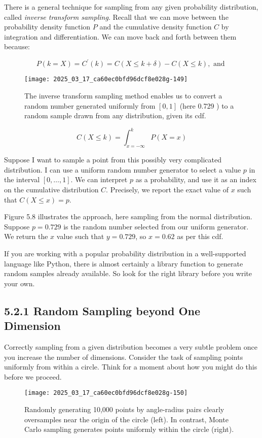 \documentclass[10pt]{article}
\begin{document}
There is a general technique for sampling from any given probability distribution, called \emph{inverse transform sampling}. Recall that we can move between the probability density function $P$ and the cumulative density function $C$ by integration and differentiation. We can move back and forth between them because:

\[
P(k=X)=C^{\prime}(k)=C(X \leq k+\delta)-C(X \leq k), \text { and }
\]

\begin{figure}[h]
\centering
\texttt{[image: 2025\_03\_17\_ca60ec0bfd96dcf8e028g-149]}
\caption{The inverse transform sampling method enables us to convert a random number generated uniformly from $[0,1]$ (here 0.729 ) to a random sample drawn from any distribution, given its cdf.}
\end{figure}

\[
C(X \leq k)=\int_{x=-\infty}^{k} P(X=x)
\]

Suppose I want to sample a point from this possibly very complicated distribution. I can use a uniform random number generator to select a value $p$ in the interval $[0, \ldots, 1]$. We can interpret $p$ as a probability, and use it as an index on the cumulative distribution $C$. Precisely, we report the exact value of $x$ such that $C(X \leq x)=p$.

Figure 5.8 illustrates the approach, here sampling from the normal distribution. Suppose $p=0.729$ is the random number selected from our uniform generator. We return the $x$ value such that $y=0.729$, so $x=0.62$ as per this cdf.

If you are working with a popular probability distribution in a well-supported language like Python, there is almost certainly a library function to generate random samples already available. So look for the right library before you write your own.

\subsection*{5.2.1 Random Sampling beyond One Dimension}
Correctly sampling from a given distribution becomes a very subtle problem once you increase the number of dimensions. Consider the task of sampling points uniformly from within a circle. Think for a moment about how you might do this before we proceed.\
\
\begin{figure}[h]
\centering
\texttt{[image: 2025\_03\_17\_ca60ec0bfd96dcf8e028g-150]}
\caption{Randomly generating 10,000 points by angle-radius pairs clearly oversamples near the origin of the circle (left). In contrast, Monte Carlo sampling generates points uniformly within the circle (right).}
\end{figure}
\end{document}
